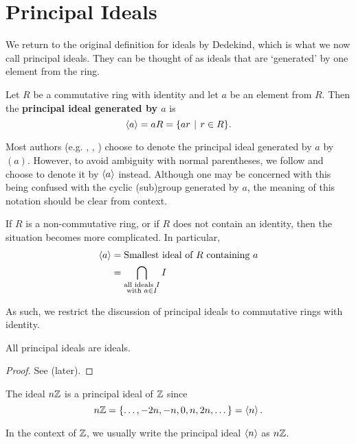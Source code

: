 \section{Principal Ideals}
We return to the original definition for ideals by Dedekind, which is what we now call principal ideals. They can be thought of as ideals that are `generated' by one element from the ring.
\begin{definition}
    Let $R$ be a commutative ring with identity and let $a$ be an element from $R$. Then the \textbf{principal ideal generated by $a$} is
    \[
        \princ{a} = aR = \{ar \vert r \in R\}.
    \]
\end{definition}
\begin{remark}
    Most authors (e.g. \cite[p.~123, Definition III.2.4]{hungerford_1980}, \cite[\S 158]{clark_1984}, \cite[p.~251]{dummit_foote_2004}) choose to denote the principal ideal generated by $a$ by $(a)$. However, to avoid ambiguity with normal parentheses, we follow \cite[p.~250, Example 3]{gallian_2016} and choose to denote it by $\left\langle a\right\rangle$ instead. Although one may be concerned with this being confused with the cyclic (sub)group generated by $a$, the meaning of this notation should be clear from context.
\end{remark}
\begin{remark}
    If $R$ is a non-commutative ring, or if $R$ does not contain an identity, then the situation becomes more complicated. In particular,
    \begin{align*}
        \left\langle a\right\rangle &= \text{Smallest ideal of } R \text{ containing }a\\
        &= \bigcap_{\substack{\text{all ideals }I \\ \text{with } a \in I}}I
    \end{align*}
    
    As such, we restrict the discussion of principal ideals to commutative rings with identity.
\end{remark}
\begin{proposition}
    All principal ideals are ideals.
\end{proposition}
\begin{proof}
    See  (later).
\end{proof}
\begin{example}
    The ideal $n\mathbb{Z}$ is a principal ideal of $\mathbb{Z}$ since
    \[
        n\mathbb{Z} = \{\dots, -2n, -n, 0, n, 2n, \dots\} = \left\langle n\right\rangle.
    \]
\end{example}
\begin{remark}
    In the context of $\mathbb{Z}$, we usually write the principal ideal $\left\langle n\right\rangle$ as $n\mathbb{Z}$.
\end{remark}

